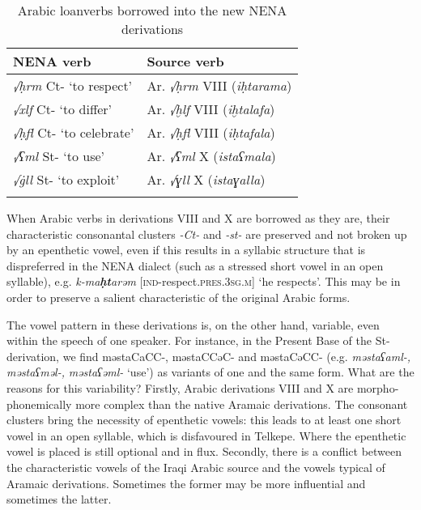 \documentclass[output=paper]{langsci/langscibook}
\begin{document}
\begin{table}
\caption{Arabic loanverbs borrowed into the new NENA derivations\label{tab:coghill:1}}
\begin{tabularx}{.75\textwidth}{QQ}
\lsptoprule
{NENA verb} & {Source verb}\\\midrule
{\textit{√ḥrm} Ct- ‘to respect’} & {Ar. \textit{√ḥrm} VIII (\textit{iḥtarama})}\\
\textit{√xlf} Ct- ‘to differ’ & {Ar. \textit{√ḫlf} VIII (\textit{iḫtalafa})}\\
{\textit{√ḥfl} Ct- ‘to celebrate’} & {Ar. \textit{√ḥfl} VIII (\textit{iḥtafala})}\\
{\textit{√ʕml} St- ‘to use’} & {Ar. \textit{√ʕml} X (\textit{istaʕmala})}\\
\textit{√\.gll} St- ‘to exploit’ & {Ar. \textit{√ɣll} X (\textit{istaɣalla})}\\
\lspbottomrule
\end{tabularx}
\end{table}

When Arabic verbs in derivations VIII and X are borrowed as they are, their characteristic consonantal clusters \textit{{}-Ct-} and \textit{{}-st-} are preserved and not broken up by an epenthetic vowel, even if this results in a syllabic structure that is dispreferred in the NENA dialect (such as a stressed short vowel in an open syllable), e.g. \textit{k-ma}\kern -0.5pt\textbf{\textit{ḥt}}\kern -1pt\textit{arəm} [\textsc{ind}\nobreakdash-respect.\textsc{pres.}3\textsc{sg.m}] ‘he respects’. This may be in order to preserve a salient characteristic of the original Arabic forms.

The vowel pattern in these derivations is, on the other hand, variable, even within the speech of one speaker. For instance, in the Present Base of the St-derivation, we find məstaCaCC-, məstaCCəC- and məstaCəCC- (e.g. \textit{məstaʕaml-,} \textit{məstaʕməl-,} \textit{məstaʕəml-} ‘use’) as variants of one and the same form. What are the reasons for this variability? Firstly, Arabic derivations VIII and X are morpho-phonemically more complex than the native Aramaic derivations. The consonant clusters bring the necessity of epenthetic vowels: this leads to at least one short vowel in an open syllable, which is disfavoured in Telkepe. Where the epenthetic vowel is placed is still optional and in flux. Secondly, there is a conflict between the characteristic vowels of the Iraqi Arabic source and the vowels typical of Aramaic derivations. Sometimes the former may be more influential and sometimes the latter.
\end{document}
